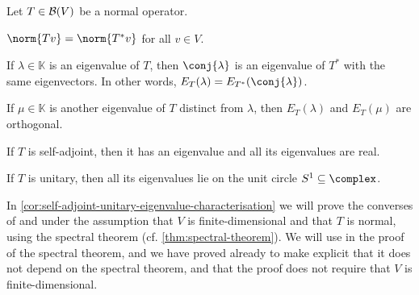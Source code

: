 \documentclass[article, a4paper, 11pt, oneside]{memoir}
\numberwithin{equation}{chapter}
\begin{document}
\begin{proposition}
    Let $T \in \mathcal{B}(V)$ be a normal operator.
    \begin{enumprop}
        \item \label{enum:normal-adjoint-norm} $\norm{Tv} = \norm{T^*v}$ for all $v \in V$.
        
        \item \label{enum:normal-adjoint-eigenvalues} If $\lambda \in \mathbb{K}$ is an eigenvalue of $T$, then $\conj{\lambda}$ is an eigenvalue of $T^*$ with the same eigenvectors. In other words, $E_T(\lambda) = E_{T^*}(\conj{\lambda})$.

        \item \label{enum:normal-orthogonal-eigenspaces} If $\mu \in \mathbb{K}$ is another eigenvalue of $T$ distinct from $\lambda$, then $E_T(\lambda)$ and $E_T(\mu)$ are orthogonal.

        \item \label{enum:self-adjoint-eigenvalues-exists-and-real} If $T$ is self-adjoint, then it has an eigenvalue and all its eigenvalues are real.

        \item \label{enum:unitary-eigenvalues-unit-circle} If $T$ is unitary, then all its eigenvalues lie on the unit circle $S^1 \subseteq \complex$.
    \end{enumprop}
\end{proposition}
%
In \cref{cor:self-adjoint-unitary-eigenvalue-characterisation} we will prove the converses of  and  under the assumption that $V$ is finite-dimensional and that $T$ is normal, using the spectral theorem (cf. \cref{thm:spectral-theorem}). We will use  in the proof of the spectral theorem, and we have proved  already to make explicit that it does not depend on the spectral theorem, and that the proof does not require that $V$ is finite-dimensional.
\end{document}
